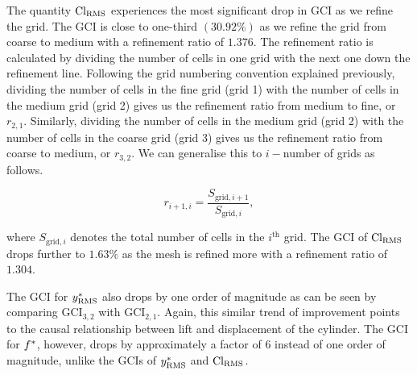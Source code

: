 \documentclass[a4paper,fleqn]{cas-sc}
\begin{document}
The quantity $\text{Cl}_{\text{RMS}}$ experiences the most significant drop in GCI as we refine the grid. The GCI is close to one-third $\left ( 30.92\% \right )$ as we refine the grid from coarse to medium with a refinement ratio of $1.376$. The refinement ratio is calculated by dividing the number of cells in one grid with the next one down the refinement line. Following the grid numbering convention explained previously, dividing the number of cells in the fine grid (grid 1) with the number of cells in the medium grid (grid 2) gives us the refinement ratio from medium to fine, or $r_{2,1}$. Similarly, dividing the number of cells in the medium grid (grid 2) with the number of cells in the coarse grid (grid 3) gives us the refinement ratio from coarse to medium, or $r_{3,2}$. We can generalise this to $i-$number of grids as follows.

\begin{equation}
  r_{i+1,i} = \frac{S_{\text{grid},i+1}}{S_{\text{grid},i}},
  \label{eq:refinementRatio}
\end{equation}

\noindent where $S_{\text{grid},i}$ denotes the total number of cells in the $i^{\text{th}}$ grid. The GCI of $\text{Cl}_{\text{RMS}}$ drops further to $1.63\%$ as the mesh is refined more with a refinement ratio of $1.304$.

The GCI for $y^{*}_{\text{RMS}}$ also drops by one order of magnitude as can be seen by comparing $\text{GCI}_{3,2}$ with $\text{GCI}_{2,1}$. Again, this similar trend of improvement points to the causal relationship between lift and displacement of the cylinder. The GCI for $f^{*}$, however, drops by approximately a factor of $6$ instead of one order of magnitude, unlike the GCIs of $y^{*}_{\text{RMS}}$ and $\text{Cl}_{\text{RMS}}$.
\end{document}
